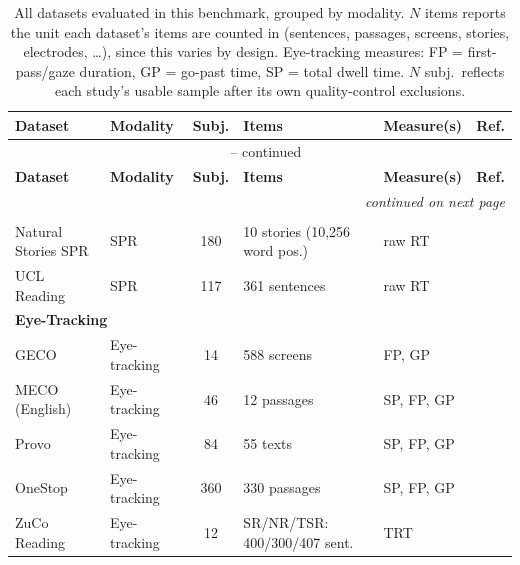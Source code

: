 {\setlength{\tabcolsep}{3pt}
\begin{longtable}{@{}p{2.45cm}p{1.5cm}cp{2.6cm}p{1.8cm}>{\raggedright\arraybackslash}p{2.0cm}@{}}
\caption{All datasets evaluated in this benchmark, grouped by modality. $N$ items reports the unit each dataset's items are counted in (sentences, passages, screens, stories, electrodes, \ldots), since this varies by design. Eye-tracking measures: FP = first-pass/gaze duration, GP = go-past time, SP = total dwell time. $N$ subj.\ reflects each study's usable sample after its own quality-control exclusions.}
\label{tab:datasets} \\
\toprule
\textbf{Dataset} & \textbf{Modality} & \textbf{Subj.} & \textbf{Items} & \textbf{Measure(s)} & \textbf{Ref.} \\
\midrule
\endfirsthead
\multicolumn{6}{c}{\tablename\ \thetable{} -- continued} \\
\toprule
\textbf{Dataset} & \textbf{Modality} & \textbf{Subj.} & \textbf{Items} & \textbf{Measure(s)} & \textbf{Ref.} \\
\midrule
\endhead
\midrule \multicolumn{6}{r}{\textit{continued on next page}} \\
\endfoot
\bottomrule
\endlastfoot
\multicolumn{6}{l}{\textbf{Self-Paced Reading}} \\
\midrule
\small Natural Stories SPR & \small SPR & \small 180 & \small 10 stories (10{,}256 word pos.) & \small raw RT & \scriptsize \citep{futrell2021natural} \\
\small UCL Reading & \small SPR & \small 117 & \small 361 sentences & \small raw RT & \scriptsize \citep{frank2013reading} \\
\midrule
\multicolumn{6}{l}{\textbf{Eye-Tracking}} \\
\midrule
\small GECO & \small Eye-tracking & \small 14 & \small 588 screens & \small FP, GP & \scriptsize \citep{cop2017geco} \\
\small MECO (English) & \small Eye-tracking & \small 46 & \small 12 passages & \small SP, FP, GP & \scriptsize \citep{siegelman2022meco} \\
\small Provo & \small Eye-tracking & \small 84 & \small 55 texts & \small SP, FP, GP & \scriptsize \citep{luke2018provo} \\
\small OneStop & \small Eye-tracking & \small 360 & \small 330 passages & \small SP, FP, GP & \scriptsize \citep{berzak2025onestop} \\
\small ZuCo Reading & \small Eye-tracking & \small 12 & \small SR/NR/TSR: 400/300/407 sent. & \small TRT & \scriptsize \citep{hollenstein2018zuco} \\

\end{longtable}}
